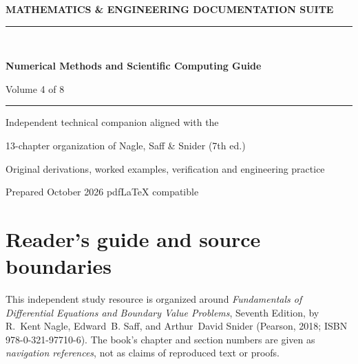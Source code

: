 \documentclass[11pt,letterpaper,oneside]{report}
\theoremstyle{definition}\newtheorem{definition}[theorem]{Definition}
\theoremstyle{remark}\newtheorem{remark}[theorem]{Remark}
\begin{document}
\hypersetup{pageanchor=false}%
\begin{titlepage}
\pagecolor{navy}\color{white}
\vspace*{0.75in}
{\sffamily\bfseries\large MATHEMATICS \& ENGINEERING DOCUMENTATION SUITE\\[12pt]}
{\color{cyan!40}\rule{\textwidth}{2pt}}\\[1.0in]
{\sffamily\bfseries\fontsize{29}{36}\selectfont Numerical Methods and Scientific Computing Guide\par}
\vspace{0.45in}
{\Large Volume 4 of 8}\par\vspace{0.55in}
{\color{cyan!30}\rule{0.50\textwidth}{1pt}}\par\vspace{0.3in}
{\large Independent technical companion aligned with the\par}
{\large 13-chapter organization of Nagle, Saff \& Snider (7th ed.)\par}
\vfill
{\large Original derivations, worked examples, verification and engineering practice\par}\vspace{0.3in}
{\small Prepared October 2026 \quad\textbullet\quad pdf\LaTeX{} compatible\par}
\end{titlepage}\hypersetup{pageanchor=true}
\nopagecolor\color{ink}
\chapter*{Reader's guide and source boundaries}
This independent study resource is organized around \emph{Fundamentals of Differential Equations and Boundary Value Problems}, Seventh Edition, by R.~Kent Nagle, Edward~B. Saff, and Arthur~David Snider (Pearson, 2018; ISBN 978-0-321-97710-6). The book's chapter and section numbers are given as \emph{navigation references}, not as claims of reproduced text or proofs.
\end{document}
